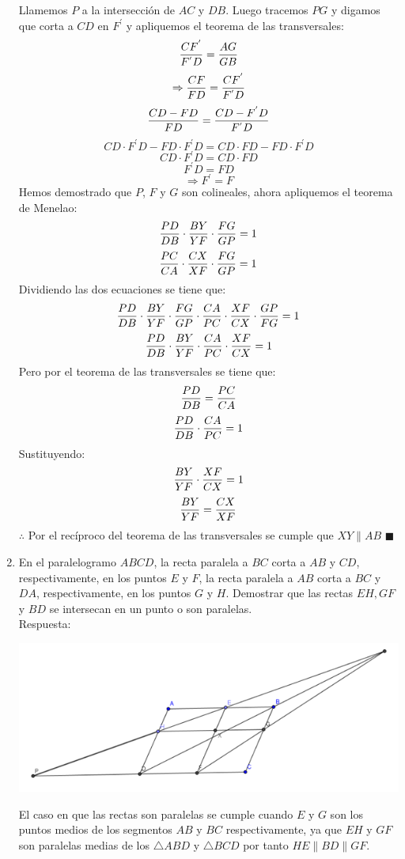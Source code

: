 \documentclass{book}
\begin{document}
\begin{enumerate}
\begin{center}
					\end{center}
					Llamemos $P$ a la intersección de $AC$ y $DB$. Luego tracemos $PG$ y digamos que corta a $CD$ en $F^{'}$ y apliquemos el teorema de las transversales:
$${CF^{'}\over F^{'} D}={AG\over GB}$$
$$\Rightarrow {CF\over FD}={CF^{'}\over F^{'} D}$$
$${CD-FD\over FD}={CD-F^{'} D\over F^{'} D}$$
$$CD\cdot F^{'} D-FD\cdot F^{'} D=CD\cdot FD-FD\cdot F^{'} D$$
$$CD\cdot F^{'} D=CD\cdot FD$$
$$F^{'} D=FD$$
$$\Rightarrow F^{'}=F$$
Hemos demostrado que $P$, $F$ y $G$ son colineales, ahora apliquemos el teorema de Menelao:
$${PD\over DB}\cdot {BY\over YF}\cdot {FG\over GP}=1$$
$${PC\over CA}\cdot {CX\over XF}\cdot {FG\over GP}=1$$
Dividiendo las dos ecuaciones se tiene que:
$${PD\over DB}\cdot {BY\over YF}\cdot {FG\over GP}\cdot {CA\over PC}\cdot {XF\over CX}\cdot {GP\over FG}=1$$
$${PD\over DB}\cdot{BY\over YF}\cdot {CA\over PC}\cdot {XF\over CX}=1$$
Pero por el teorema de las transversales se tiene que:
$${PD\over DB}={PC\over CA}$$
$${PD\over DB}\cdot{CA\over PC}=1$$
Sustituyendo:
$${BY\over YF}\cdot{XF\over CX}=1$$
$${BY\over YF}={CX\over XF}$$
$\therefore$ Por el recíproco del teorema de las transversales se cumple que $XY\parallel AB$ $\blacksquare$\\
				\item En el paralelogramo $ABCD$, la recta paralela a $BC$ corta a $AB$ y $CD$, respectivamente, en los puntos $E$ y $F$, la recta paralela a $AB$ corta a $BC$ y $DA$, respectivamente, en los puntos $G$ y $H$. Demostrar que las rectas $EH,GF$ y $BD$ se intersecan en un punto o son paralelas. \\
					Respuesta:
					\begin{center}
						\includegraphics[scale=1]{imagenes/Geometria/14.png}
					\end{center}
					El caso en que las rectas son paralelas se cumple cuando $E$ y $G$ son los puntos medios de los segmentos $AB$ y $BC$ respectivamente, ya que $EH$ y $GF$ son paralelas medias de los $\triangle ABD$ y $\triangle BCD$ por tanto $HE\parallel BD\parallel GF$.\\

\end{enumerate}
\end{document}
